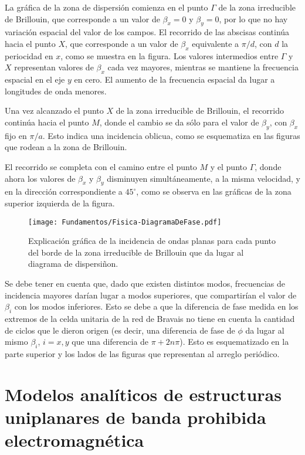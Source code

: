 La gráfica de la zona de dispersión comienza en el punto $\Gamma$ de la zona irreducible de Brillouin, que corresponde a un valor de $\beta_x = 0$ y $\beta_y = 0$, por lo que no hay variación espacial del valor de los campos. El recorrido de las abscisas continúa hacia el punto $X$, que corresponde a un valor de $\beta_x$ equivalente a $\pi / d$, con $d$ la periocidad en $x$, como se muestra en la figura. Los valores intermedios entre $\Gamma$ y $X$ representan valores de $\beta_x$ cada vez mayores, mientras se mantiene la frecuencia espacial en el eje $y$ en cero. El aumento de la frecuencia espacial da lugar a longitudes de onda menores.

Una vez alcanzado el punto $X$ de la zona irreducible de Brillouin, el recorrido continúa hacia el punto $M$, donde el cambio se da sólo para el valor de $\beta_y$, con $\beta_x$ fijo en $\pi / a$. Esto indica una incidencia oblicua, como se esquematiza en las figuras que rodean a la zona de Brillouin.

El recorrido se completa con el camino entre el punto $M$ y el punto $\Gamma$, donde ahora los valores de $\beta_x$ y $\beta_y$ disminuyen simultáneamente, a la misma velocidad, y en la dirección correspondiente a $45^\circ$, como se observa en las gráficas de la zona superior izquierda de la figura.

\begin{figure}[h]
	\centering
	\texttt{[image: Fundamentos/Fisica-DiagramaDeFase.pdf]}
	\caption{Explicación gráfica de la incidencia de ondas planas para cada punto del borde de la zona irreducible de Brillouin que da lugar al diagrama de dispersiñon.}
	\label{fig:explicacion-zona-brillouin}
\end{figure}

Se debe tener en cuenta que, dado que existen distintos modos, frecuencias de incidencia mayores darían lugar a modos superiores, que compartirían el valor de $\beta_i$ con los modos inferiores. Esto se debe a que la diferencia de fase medida en los extremos de la celda unitaria de la red de Bravais no tiene en cuenta la cantidad de ciclos que le dieron origen (es decir, una diferencia de fase de $\phi$ da lugar al mismo $\beta_i$, $i=x,y$ que una diferencia de $\pi+2 n \pi$). Esto es esquematizado en la parte superior y los lados de las figuras que representan al arreglo periódico.

\section{Modelos analíticos de estructuras uniplanares de banda prohibida electromagnética}
\label{sec_analitico}

